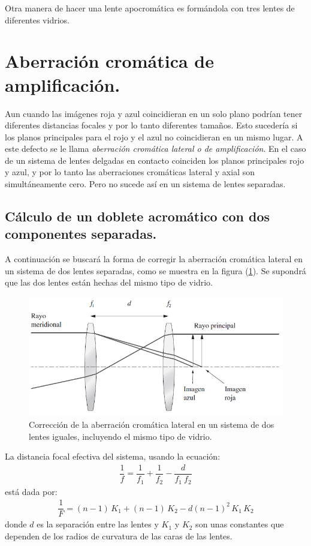 \documentclass[14pt]{extarticle}
\begin{document}
Otra manera de hacer una lente apocromática es formándola con tres lentes de diferentes vidrios.

\section{Aberración cromática  de amplificación.}

Aun cuando las imágenes roja y azul coincidieran en un solo plano podrían tener diferentes distancias focales y por lo tanto diferentes tamaños. Esto sucedería si los planos principales para el rojo y el azul no coincidieran en un mismo lugar. A este defecto se le llama \textit{aberración cromática lateral o de amplificación}. En el caso de un sistema de lentes delgadas en contacto coinciden los planos principales rojo y azul, y por lo tanto las aberraciones cromáticas lateral y axial son simultáneamente cero. Pero no sucede así en un sistema de lentes separadas.

\subsection{Cálculo de un doblete acromático con dos componentes separadas.}

A continuación se buscará la forma de corregir la aberración cromática lateral en un sistema de dos lentes separadas, como se muestra en la figura (\ref{fig:figura_V_02}). Se supondrá que las dos lentes están hechas del mismo tipo de vidrio.
\begin{figure}[H]
    \centering
    \includegraphics[scale=0.8]{Imagenes/Aberraciones_02.png}
    \caption{Corrección de la aberración cromática lateral en un sistema de dos lentes iguales, incluyendo el mismo tipo de vidrio.}
    \label{fig:figura_V_02}
\end{figure}
La distancia focal efectiva del sistema, usando la ecuación:
\begin{align*}
\dfrac{1}{f} = \dfrac{1}{f_{1}} + \dfrac{1}{f_{2}} - \dfrac{d}{f_{1} \ f_{2}}
\end{align*}
está dada por:
\begin{align}
\dfrac{1}{F} = (n - 1) \, K_{1} + (n - 1) \, K_{2} - d (n - 1)^{2} \, K_{1} \, K_{2}
\label{eq:ecuacion_V_15}
\end{align}
donde $d$ es la separación entre las lentes y $K_{1}$ y $K_{2}$ son unas constantes que dependen de los radios de curvatura de las caras de las lentes.
\end{document}
